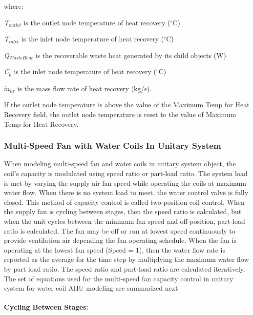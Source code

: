 where:

\emph{T\(_{outlet}\)} is the outlet node temperature of heat recovery (\(^{\circ}\)C)

\emph{T\(_{inlet}\)} is the inlet node temperature of heat recovery (\(^{\circ}\)C)

\emph{Q\(_{WasteHeat}\)} is the recoverable waste heat generated by its child objects (W)

\emph{C\(_{p}\)} is the inlet node temperature of heat recovery (\(^{\circ}\)C)

\({\dot m_{hr}}\) is the mass flow rate of heat recovery (kg/s).

If the outlet node temperature is above the value of the Maximum Temp for Heat Recovery field, the outlet node temperature is reset to the value of Maximum Temp for Heat Recovery.

\subsubsection{Multi-Speed Fan with Water Coils In Unitary System}\label{multi-speed-fan-with-water-coils-in-unitary-system}

When modeling multi-speed fan and water coils in unitary system object, the coil's capacity is modulated using speed ratio or part-load ratio. The system load is met by varying the supply air fan speed while operating the coils at maximum water flow. When there is no system load to meet, the water control valve is fully closed. This method of capacity control is called two-position coil control. When the supply fan is cycling between stages, then the speed ratio is calculated, but when the unit cycles between the minimum fan speed and off-position, part-load ratio is calculated. The fan may be off or run at lowest speed continuously to provide ventilation air depending the fan operating schedule. When the fan is operating at the lowest fan speed (Speed = 1), then the water flow rate is reported as the average for the time step by multiplying the maximum water flow by part load ratio. The speed ratio and part-load ratio are calculated iteratively. The set of equations used for the multi-speed fan capacity control in unitary system for water coil AHU modeling are summarized next

\paragraph{Cycling Between Stages:}\label{cycling-between-stages}

